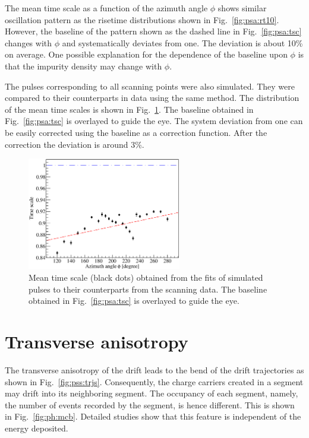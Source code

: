 The mean time scale as a function of the azimuth angle $\phi$ shows similar oscillation pattern as the risetime distributions shown in Fig.~\ref{fig:psa:rt10}. However, the baseline of the pattern shown as the dashed line in Fig.~\ref{fig:psa:tsc} changes with $\phi$ and systematically deviates from one. The deviation is about 10\% on average. One possible explanation for the dependence of the baseline upon $\phi$ is that the impurity density may change with $\phi$.

The pulses corresponding to all scanning points were also simulated. They were compared to their counterparts in data using the same method. The distribution of the mean time scales is shown in Fig.~\ref{fig:psa:tsl}. The baseline obtained in Fig.~\ref{fig:psa:tsc} is overlayed to guide the eye. The system deviation from one can be easily corrected using the baseline as a correction function. After the correction the deviation is around 3\%.

\begin{figure}[htbp]
\centering
\includegraphics[width=0.6\textwidth]{tsline}
\caption{Mean time scale (black dots) obtained from the fits of simulated pulses to their counterparts from the scanning data. The baseline obtained in Fig.~\ref{fig:psa:tsc} is overlayed to guide the eye.}
\label{fig:psa:tsl}
\end{figure}


\section{Transverse anisotropy}
\label{sec:psa:tra}
The transverse anisotropy of the drift leads to the bend of the drift trajectories as shown in Fig.~\ref{fig:pss:trjs}. Consequently, the charge carriers created in a segment may drift into its neighboring segment. The occupancy of each segment, namely, the number of events recorded by the segment, is hence different. This is shown in Fig.~\ref{fig:ph:mcb}. Detailed studies show that this feature is independent of the energy deposited.


